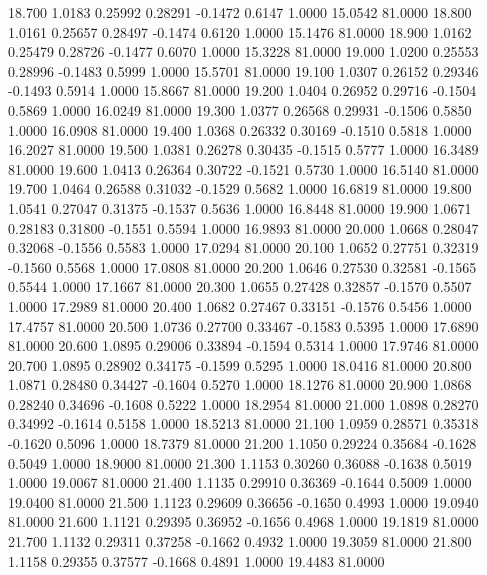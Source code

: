   18.700   1.0183   0.25992   0.28291  -0.1472   0.6147   1.0000  15.0542  81.0000
  18.800   1.0161   0.25657   0.28497  -0.1474   0.6120   1.0000  15.1476  81.0000
  18.900   1.0162   0.25479   0.28726  -0.1477   0.6070   1.0000  15.3228  81.0000
  19.000   1.0200   0.25553   0.28996  -0.1483   0.5999   1.0000  15.5701  81.0000
  19.100   1.0307   0.26152   0.29346  -0.1493   0.5914   1.0000  15.8667  81.0000
  19.200   1.0404   0.26952   0.29716  -0.1504   0.5869   1.0000  16.0249  81.0000
  19.300   1.0377   0.26568   0.29931  -0.1506   0.5850   1.0000  16.0908  81.0000
  19.400   1.0368   0.26332   0.30169  -0.1510   0.5818   1.0000  16.2027  81.0000
  19.500   1.0381   0.26278   0.30435  -0.1515   0.5777   1.0000  16.3489  81.0000
  19.600   1.0413   0.26364   0.30722  -0.1521   0.5730   1.0000  16.5140  81.0000
  19.700   1.0464   0.26588   0.31032  -0.1529   0.5682   1.0000  16.6819  81.0000
  19.800   1.0541   0.27047   0.31375  -0.1537   0.5636   1.0000  16.8448  81.0000
  19.900   1.0671   0.28183   0.31800  -0.1551   0.5594   1.0000  16.9893  81.0000
  20.000   1.0668   0.28047   0.32068  -0.1556   0.5583   1.0000  17.0294  81.0000
  20.100   1.0652   0.27751   0.32319  -0.1560   0.5568   1.0000  17.0808  81.0000
  20.200   1.0646   0.27530   0.32581  -0.1565   0.5544   1.0000  17.1667  81.0000
  20.300   1.0655   0.27428   0.32857  -0.1570   0.5507   1.0000  17.2989  81.0000
  20.400   1.0682   0.27467   0.33151  -0.1576   0.5456   1.0000  17.4757  81.0000
  20.500   1.0736   0.27700   0.33467  -0.1583   0.5395   1.0000  17.6890  81.0000
  20.600   1.0895   0.29006   0.33894  -0.1594   0.5314   1.0000  17.9746  81.0000
  20.700   1.0895   0.28902   0.34175  -0.1599   0.5295   1.0000  18.0416  81.0000
  20.800   1.0871   0.28480   0.34427  -0.1604   0.5270   1.0000  18.1276  81.0000
  20.900   1.0868   0.28240   0.34696  -0.1608   0.5222   1.0000  18.2954  81.0000
  21.000   1.0898   0.28270   0.34992  -0.1614   0.5158   1.0000  18.5213  81.0000
  21.100   1.0959   0.28571   0.35318  -0.1620   0.5096   1.0000  18.7379  81.0000
  21.200   1.1050   0.29224   0.35684  -0.1628   0.5049   1.0000  18.9000  81.0000
  21.300   1.1153   0.30260   0.36088  -0.1638   0.5019   1.0000  19.0067  81.0000
  21.400   1.1135   0.29910   0.36369  -0.1644   0.5009   1.0000  19.0400  81.0000
  21.500   1.1123   0.29609   0.36656  -0.1650   0.4993   1.0000  19.0940  81.0000
  21.600   1.1121   0.29395   0.36952  -0.1656   0.4968   1.0000  19.1819  81.0000
  21.700   1.1132   0.29311   0.37258  -0.1662   0.4932   1.0000  19.3059  81.0000
  21.800   1.1158   0.29355   0.37577  -0.1668   0.4891   1.0000  19.4483  81.0000

